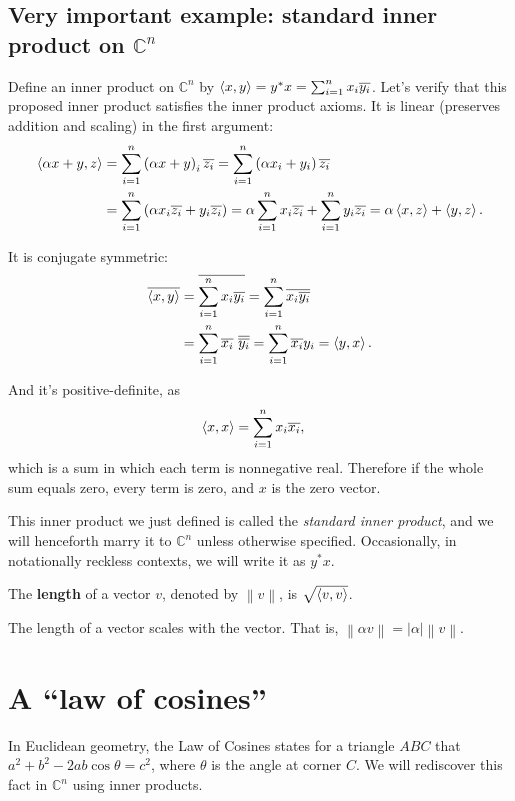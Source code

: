\subsection{Very important example: standard inner product on \(\mathbb{C}^n\)}
Define an inner product on
\(\mathbb{C}^n\) by
\(\left\langle x, y\right\rangle = y^* x = \sum_{i=1}^{n} x_i \overline{y_i}\).
Let's verify that this proposed inner product satisfies the inner product axioms.
It is linear (preserves addition and scaling) in the first argument:
\begin{align*}
  \innerprod{\alpha x+y}{z} &= \sum_{i=1}^{n} \del{\alpha x + y}_i \conj{z_i}
  = \sum_{i=1}^{n} \del{\alpha x_i + y_i} \conj{z_i}\\
  &= \sum_{i=1}^{n} \del{\alpha x_i \conj{ z_i }+ y_i \conj {z_i}}
  = \alpha \sum_{i=1}^{n} x_i \conj{ z_i }
  + \sum_{i=1}^{n} y_i \conj {z_i}
  = \alpha \innerprod x z + \innerprod y z.
\end{align*}

It is conjugate symmetric:
\begin{align*}
  \overline{\left\langle x, y\right\rangle}
  &= \overline{
  \sum_{i=1}^{n} x_i \overline{y_i}
  }
  = \sum_{i=1}^{n} \overline{x_i \overline{y_i}}\\
  &= \sum_{i=1}^{n} \overline{x_i} \ \overline{\overline{y_i}}
  = \sum_{i=1}^{n} \overline{x_i} {y_i}
  = \left\langle y, x\right\rangle.
\end{align*}

And it's positive-definite, as
\begin{align}
  \left\langle x, x\right\rangle
  &= \sum_{i=1}^n x_i \overline{x_i},
\end{align}
which is a sum in which each term is nonnegative real.
Therefore if the whole sum equals zero, every term is zero, and \(x\) is the zero vector.

This inner product we just defined is called the \emph{standard inner product},
and we will henceforth marry it to \(\mathbb{C}^n\) unless otherwise specified.
Occasionally, in notationally reckless contexts, we will write it as \(y^*x \).

\begin{definition}
  The \textbf{length} of a vector \(v\), denoted by \(\left\|v\right\|\), is \(\sqrt{\left\langle v, v\right\rangle}\).
\end{definition}

The length of a vector scales with the vector.
That is, \(\left\| \alpha v \right\| = |\alpha| \left\|v\right\|\).

\section{A ``law of cosines''}
In Euclidean geometry,
the Law of Cosines states for a triangle \(ABC\) that
\(a^2 + b^2 - 2ab \cos{\theta} = c^2\),
where \(\theta\) is the angle at corner \(C\).
We will rediscover this fact in \(\mathbb{C}^n\) using inner products.

